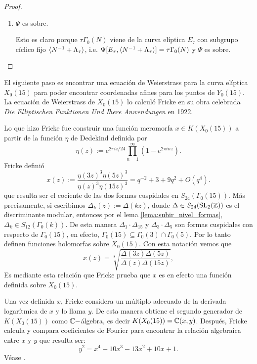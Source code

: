 \documentclass[../../tesis_maestria]{subfiles}
\begin{document}
\begin{proof}
\begin{enumerate}[label=\emph{\roman*})]
  \item $\Psi$ es sobre.
  
  \-\;\; Esto es claro porque $\tau\Gamma_0(N)$ viene de la curva elíptica $E_\tau$ con subgrupo cíclico fijo $\langle N^{-1}+\Lambda_\tau \rangle$, i.e. $\Psi[E_\tau,\langle N^{-1}+\Lambda_\tau \rangle]=\tau\Gamma_0(N)$ y $\Psi$ es sobre.
\end{enumerate}
\end{proof}

El siguiente paso es encontrar una ecuación de Weierstrass para la curva elíptica $X_0(15)$ para poder encontrar coordenadas afines para los puntos de $Y_0(15)$. La ecuación de Weierstrass de $X_0(15)$ lo calculó Fricke en su obra celebrada \emph{Die Elliptischen Funktionen Und Ihere Anwendungen} en 1922.

Lo que hizo Fricke fue construir una función meromorfa $x\in K(X_0(15))$ a partir de la función $\eta$ de Dedekind definida por
\[
	\eta(z):=e^{2\pi iz/24}\prod_{n=1}^\infty(1-e^{2\pi inz}).
\]
Fricke definió
\begin{equation}\label{eq:def_x_fricke}
	x(z):=
	\frac{\eta(3z)^3\eta(5z)^3}{\eta(z)^3\eta(15z)^3}=
	q^{-2}+3+9q^2+O(q^4).
\end{equation}
que resulta ser el cociente de las dos formas cuspidales en $S_{24}(\Gamma_0(15))$. Más precisamente, si escribimos $\Delta_k(z):=\Delta(kz)$, donde $\Delta\in S_{24}(\mathrm{SL}_2(\mathbb{Z}))$ es el discriminante modular, entonces por el lema \ref{lema:subir_nivel_formas}, $\Delta_k\in S_{12}(\Gamma_0(k))$. De esta manera $\Delta_1\cdot\Delta_{15}$ y $\Delta_3\cdot\Delta_5$ son formas cuspidales con respecto de $\Gamma_0(15)$, en efecto, $\Gamma_0(15)\subseteq\Gamma_0(3)\cap\Gamma_0(5)$. Por lo tanto definen funciones holomorfas sobre $X_0(15)$. Con esta notación vemos que
\[
	x(z)=\sqrt[8]{\frac{\Delta(3z)\Delta(5z)}{\Delta(z)\Delta(15z)}},
\]
 Es mediante esta relación que Fricke prueba que $x$ es en efecto una función definida sobre $X_0(15)$.
 
 Una vez definida $x$, Fricke considera un múltiplo adecuado de la derivada logarítmica de $x$ y lo llama $y$. De esta manera obtiene el segundo generador de $K(X_0(15))$ como $\mathbb{C}-$álgebra, es decir $K(X_0(15))=\mathbb{C}(x,y)$. Después, Fricke calcula y compara coeficientes de Fourier para encontrar la relación algebraica entre $x$ y $y$ que resulta ser:
\begin{equation}\label{eq:formula_fricke}
		y^2=x^4-10x^3-13x^2+10x+1.
\end{equation}
Véase \cite[página 439]{Fricke}.
\end{document}
